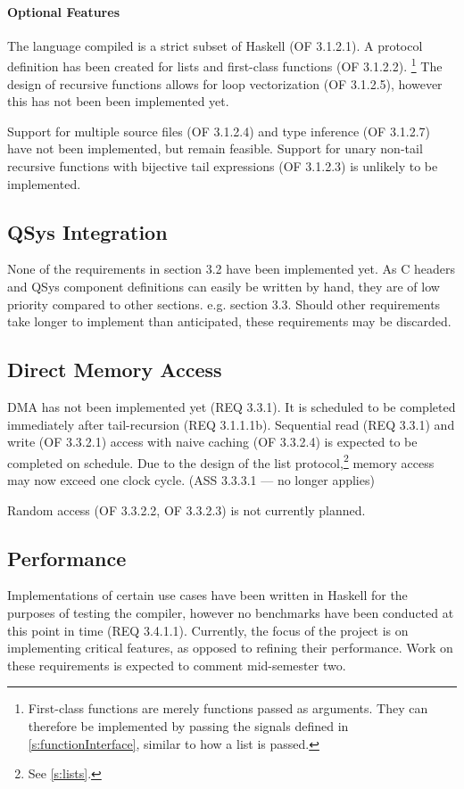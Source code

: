 \documentclass[english,onecolumn]{article}
\begin{document}
\paragraph{Optional Features}
The language compiled is a strict subset of Haskell (OF 3.1.2.1). A protocol definition has been created for lists and first-class functions (OF 3.1.2.2).%
\footnote{First-class functions are merely functions passed as arguments. They can therefore be implemented by passing the signals defined in \ref{s:functionInterface}, similar to how a list is passed.}
The design of recursive functions allows for loop vectorization (OF 3.1.2.5), however this has not been been implemented yet.

Support for multiple source files (OF 3.1.2.4) and type inference (OF 3.1.2.7) have not been implemented, but remain feasible. Support for unary non-tail recursive functions with bijective tail expressions (OF 3.1.2.3) is unlikely to be implemented.

\subsection{QSys Integration}
None of the requirements in section 3.2 have been implemented yet.
As C headers and QSys component definitions can easily be written by hand, they are of low priority compared to other sections. e.g. section 3.3. Should other requirements take longer to implement than anticipated, these requirements may be discarded.

\subsection{Direct Memory Access}
DMA has not been implemented yet (REQ 3.3.1). It is scheduled to be completed immediately after tail-recursion (REQ 3.1.1.1b). 
Sequential read (REQ 3.3.1) and write (OF 3.3.2.1) access with naive caching (OF 3.3.2.4) is expected to be completed on schedule. 
Due to the design of the list protocol,\footnote{See \ref{s:lists}.} memory access may now exceed one clock cycle. (ASS 3.3.3.1 --- no longer applies)

Random access (OF 3.3.2.2, OF 3.3.2.3) is not currently planned.

\subsection{Performance}
Implementations of certain use cases have been written in Haskell for the purposes of testing the compiler, however no benchmarks have been conducted at this point in time (REQ 3.4.1.1). Currently, the focus of the project is on implementing critical features, as opposed to refining their performance. Work on these requirements is expected to comment mid-semester two.
\end{document}
